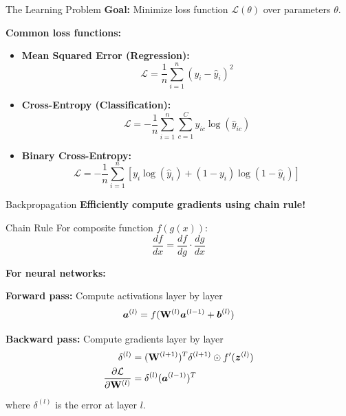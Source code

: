 \documentclass[aspectratio=169]{beamer}
\begin{document}
\begin{frame}{The Learning Problem}
  \textbf{Goal:} Minimize loss function $\mathcal{L}(\theta)$ over parameters $\theta$.

  \vspace{0.5em}

  \textbf{Common loss functions:}

  \begin{itemize}
    \item \textbf{Mean Squared Error (Regression):}
    \begin{equation}
      \mathcal{L} = \frac{1}{n} \sum_{i=1}^n (y_i - \hat{y}_i)^2
    \end{equation}

    \item \textbf{Cross-Entropy (Classification):}
    \begin{equation}
      \mathcal{L} = -\frac{1}{n} \sum_{i=1}^n \sum_{c=1}^C y_{ic} \log(\hat{y}_{ic})
    \end{equation}

    \item \textbf{Binary Cross-Entropy:}
    \begin{equation}
      \mathcal{L} = -\frac{1}{n} \sum_{i=1}^n [y_i \log(\hat{y}_i) + (1-y_i)\log(1-\hat{y}_i)]
    \end{equation}
  \end{itemize}
\end{frame}

\begin{frame}{Backpropagation}
  \textbf{Efficiently compute gradients using chain rule!}

  \begin{definitionbox}{Chain Rule}
    For composite function $f(g(x))$:
    \begin{equation}
      \frac{df}{dx} = \frac{df}{dg} \cdot \frac{dg}{dx}
    \end{equation}
  \end{definitionbox}

  \vspace{0.5em}

  \textbf{For neural networks:}

  \textbf{Forward pass:} Compute activations layer by layer
  \begin{equation}
    \boldsymbol{a}^{(l)} = f(\mathbf{W}^{(l)} \boldsymbol{a}^{(l-1)} + \boldsymbol{b}^{(l)})
  \end{equation}

  \textbf{Backward pass:} Compute gradients layer by layer
  \begin{align}
    \delta^{(l)} &= (\mathbf{W}^{(l+1)})^T \delta^{(l+1)} \odot f'(\boldsymbol{z}^{(l)}) \\
    \frac{\partial \mathcal{L}}{\partial \mathbf{W}^{(l)}} &= \delta^{(l)} (\boldsymbol{a}^{(l-1)})^T
  \end{align}

  where $\delta^{(l)}$ is the error at layer $l$.
\end{frame}
\end{document}
